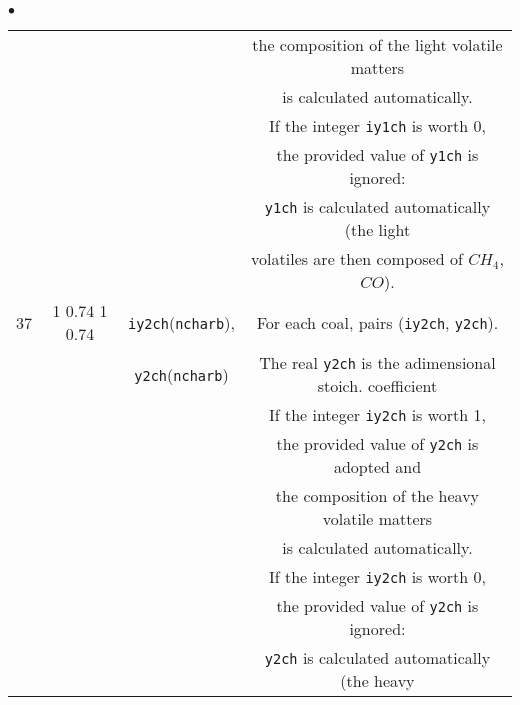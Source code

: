 {{{\begin{list}{$\bullet$}{}
\begin{table}[htbp]
\begin{center}
{\begin{tabular}{|c|c|c|c|}
        &                                &                               & the composition of the light volatile matters        \\
        &                                &                               & is calculated automatically.                         \\
        &                                &                               & If the integer \texttt{iy1ch} is worth 0,                     \\
        &                                &                               & the provided value of \texttt{y1ch} is ignored:               \\
        &                                &                               & \texttt{y1ch} is calculated automatically (the light          \\
        &                                &                               & volatiles are then composed of {$CH_{4}$}, {$CO$}).  \\ \hline
  37    &  1  0.74      1  0.74          & \texttt{iy2ch\index{iy2ch}}(\texttt{ncharb}),   & For each coal, pairs (\texttt{iy2ch}, \texttt{y2ch}).                  \\
        &                                & \texttt{y2ch\index{y2ch}}(\texttt{ncharb})     & The real \texttt{y2ch} is the adimensional stoich. coefficient\\
        &                                &                               & If the integer \texttt{iy2ch} is worth 1,                     \\
        &                                &                               & the provided value of \texttt{y2ch} is adopted and            \\
        &                                &                               & the composition of the heavy volatile matters        \\
        &                                &                               & is calculated automatically.                         \\
        &                                &                               & If the integer \texttt{iy2ch} is worth 0,                     \\
        &                                &                               & the provided value of \texttt{y2ch} is ignored:               \\
        &                                &                               & \texttt{y2ch} is calculated automatically (the heavy          \\

\end{tabular}}
\end{center}
\end{table}
\end{list}}}}
